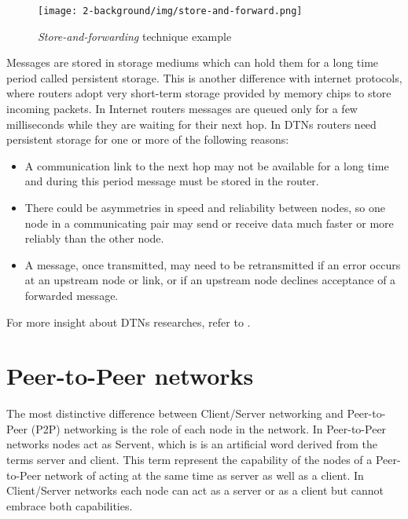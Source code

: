 \begin{figure}[htpb]
  \begin{center}
    \texttt{[image: 2-background/img/store-and-forward.png]}
    \caption{\textit{Store-and-forwarding} technique example}    
    \label{fig:store-carry-forward}
  \end{center}
\end{figure}

Messages are stored in storage mediums which can hold them for a long time period called persistent storage. This is another difference with internet protocols, where routers adopt very short-term storage provided by memory chips to store incoming packets. In Internet routers messages are queued only for a few milliseconds while they are waiting for their next hop. In DTNs routers need persistent storage for one or more of the following reasons:
\begin{itemize}
\item A communication link to the next hop may not be available for a long time and during this period message must be stored in the router.
\item There could be asymmetries in speed and reliability between nodes, so one node in a communicating pair may send or receive data much faster or more reliably than the other node.
\item A message, once transmitted, may need to be retransmitted if an error occurs at an upstream node or link, or if an upstream node declines acceptance of a forwarded message.
\end{itemize}

For more insight about DTNs researches, refer to \cite{dtnResearch}.

 
\section{Peer-to-Peer networks}
The most distinctive difference between Client/Server networking and Peer-to-Peer (P2P) networking is the role of each node in the network. In Peer-to-Peer networks nodes act as Servent, which is is an artificial word derived from the terms server and client. This term represent the capability of the nodes of a Peer-to-Peer network of acting at the same time as server as well as a client. In Client/Server networks each node can act as a server or as a client but cannot embrace both capabilities.
\\

